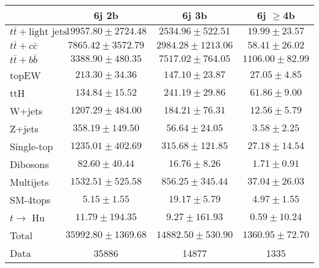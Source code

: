 \begin{table}
\begin{center}
  \begin{tabular}{ | l |  c |  c |  c | }
    \hline \hline 
     & 6j 2b  & 6j 3b  & 6j $\geq$4b  \\ 
    \hline 
     $t\bar{t}+\text{light jets}$  &   $ 19957.80 \pm 2724.48 $ &   $ 2534.96 \pm 522.51 $ &   $ 19.99 \pm 23.57 $ \\ 
     $t\bar{t}+c\bar{c}$  &   $ 7865.42 \pm 3572.79 $ &   $ 2984.28 \pm 1213.06 $ &   $ 58.41 \pm 26.02 $ \\ 
     $t\bar{t}+b\bar{b}$  &   $ 3388.90 \pm 480.35 $ &   $ 7517.02 \pm 764.05 $ &   $ 1106.00 \pm 82.99 $ \\ 
    topEW  &   $ 213.30 \pm 34.36 $ &   $ 147.10 \pm 23.87 $ &   $ 27.05 \pm 4.85 $ \\ 
    ttH  &   $ 134.84 \pm 15.52 $ &   $ 241.19 \pm 29.86 $ &   $ 61.86 \pm 9.00 $ \\ 
    W+jets  &   $ 1207.29 \pm 484.00 $ &   $ 184.21 \pm 76.31 $ &   $ 12.56 \pm 5.79 $ \\ 
    Z+jets  &   $ 358.19 \pm 149.50 $ &   $ 56.64 \pm 24.05 $ &   $ 3.58 \pm 2.25 $ \\ 
    Single-top  &   $ 1235.01 \pm 402.69 $ &   $ 315.68 \pm 121.85 $ &   $ 27.18 \pm 14.54 $ \\ 
    Dibosons  &   $ 82.60 \pm 40.44 $ &   $ 16.76 \pm 8.26 $ &   $ 1.71 \pm 0.91 $ \\ 
    Multijets  &   $ 1532.51 \pm 525.58 $ &   $ 856.25 \pm 345.44 $ &   $ 37.04 \pm 26.03 $ \\ 
    SM-4tops  &   $ 5.15 \pm 1.55 $ &   $ 19.17 \pm 5.79 $ &   $ 4.97 \pm 1.55 $ \\ 
     $t\rightarrow$ Hu  &   $ 11.79 \pm 194.35 $ &   $ 9.27 \pm 161.93 $ &   $ 0.59 \pm 10.24 $ \\ 
    Total  &   $ 35992.80 \pm 1369.68 $ &   $ 14882.50 \pm 530.90 $ &   $ 1360.95 \pm 72.70 $ \\ 
    \hline 
    Data  & 35886  & 14877  & 1335  \\ 
    \hline \hline 
  \end{tabular} 


\end{center}
\end{table}
